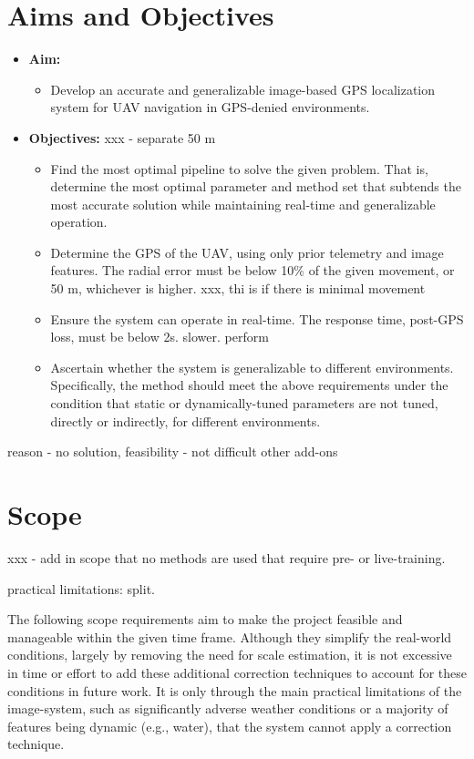 \section{Aims and Objectives}
\begin{itemize}
    \item \textbf{Aim:}
    \begin{itemize}
        \item Develop an accurate and generalizable image-based GPS localization system for UAV navigation in GPS-denied environments. 
    \end{itemize}
    \item \textbf{Objectives:} xxx - separate 50 m
    \begin{itemize} enum, sub-pts
        \item Find the most optimal pipeline to solve the given problem. That is, determine the most optimal parameter and method set that subtends the most accurate solution while maintaining real-time and generalizable operation.
        \item Determine the GPS of the UAV, using only prior telemetry and image features. The radial error must be below 10\% of the given movement, or 50 m, whichever is higher. xxx, thi is if there is minimal movement
        \item Ensure the system can operate in real-time. The response time, post-GPS loss, must be below 2s. slower. perform 
        \item Ascertain whether the system is generalizable to different environments. Specifically, the method should meet the above requirements under the condition that static or dynamically-tuned parameters are not tuned, directly or indirectly, for different environments.
    \end{itemize}
\end{itemize}

reason - no solution, feasibility - not difficult other add-ons
\section{Scope}


xxx - add in scope that no methods are used that require pre- or live-training.


practical limitations: split. 

The following scope requirements aim to make the project feasible and manageable within the given time frame. Although they simplify the real-world conditions, largely by removing the need for scale estimation, it is not excessive in time or effort to add these additional correction techniques to account for these conditions in future work. It is only through the main practical limitations of the image-system, such as significantly adverse weather conditions or a majority of features being dynamic (e.g., water), that the system cannot apply a correction technique.  

